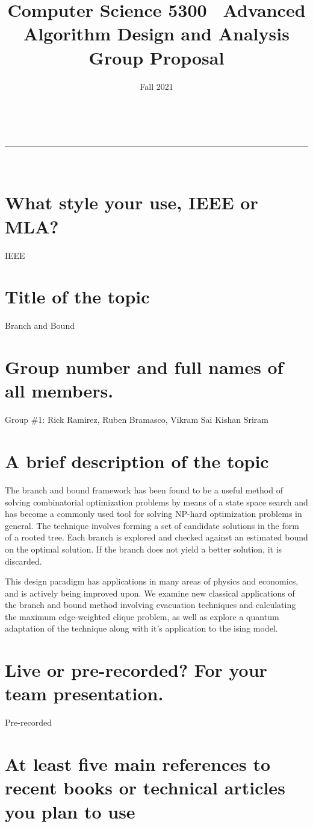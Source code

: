 \documentclass[11pt]{article}
\title{Computer Science 5300
\partition\
    Advanced Algorithm Design and Analysis\\
    \vspace{1ex}
    Group Proposal}
\author{\small }
\date{Fall 2021}
\makeatletter
\newcommand{\partition}{\rule{\linewidth}{0.8pt}}
\renewcommand{\maketitle}{
    \begin{center}
        \@date \hfill  \@author\\
        {\Large \textsc{\@title}}
        \partition\\
    \end{center}
}
\makeatother
\begin{document}
	\vspace*{-3cm}
	{\let\newpage\relax\maketitle}
	    
    \section{\normalsize What style your use, IEEE or MLA?}
        IEEE
    \section{\normalsize Title of the topic}
        Branch and Bound
    \section{\normalsize Group number and full names of all members.}
        Group \#1: Rick Ramirez, Ruben Bramasco, Vikram Sai Kishan Sriram
    \section{\normalsize A brief description of the topic}
    	The branch and bound framework has been found to be a useful method of solving combinatorial optimization problems by means of a state space search and has become a commonly used tool for solving NP-hard optimization problems in general. The technique involves forming a set of candidate solutions in the form of a rooted tree. Each branch is explored and checked against an estimated bound on the optimal solution. If the branch does not yield a better solution, it is discarded. 
    	
    	This design paradigm has applications in many areas of physics and economics, and is actively being improved upon. We examine new classical applications of the branch and bound method involving evacuation techniques and calculating the maximum edge-weighted clique problem, as well as explore a quantum adaptation of the technique along with it's application to the ising model.
    \section{\normalsize Live or pre-recorded? For your team presentation.}
        Pre-recorded
    \section{\normalsize At least five main references to recent books or technical articles you plan to use}

    \nocite{montanaro2020quantum, baccari2020verifying, san2019new, goerigk2013branch, cormen2009introduction}
    
    
\end{document}
